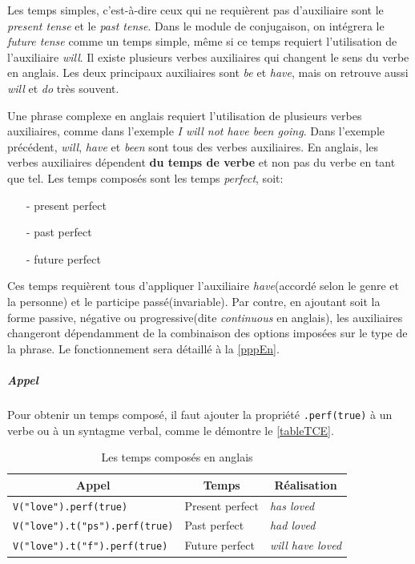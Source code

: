 \documentclass[11pt]{article} %
\newcommand{\real}[1]{\emph{#1}}
\begin{document}
Les temps simples, c'est-à-dire ceux qui ne requièrent pas d'auxiliaire
sont le \emph{present tense} et le \emph{past tense}. Dans le module de
conjugaison, on intégrera le \emph{future tense} comme un temps simple, même si 
ce temps requiert l'utilisation de l'auxiliaire \emph{will}.
Il existe plusieurs verbes auxiliaires qui changent
le sens du verbe en anglais. Les deux principaux auxiliaires sont \emph{be}
et \emph{have}, mais on retrouve aussi \emph{will} et \emph{do} très souvent.

Une phrase complexe en anglais requiert l'utilisation de plusieurs verbes auxiliaires,
comme dans l'exemple \real{I will not have been going}. Dans l'exemple
précédent, \emph{will}, \emph{have} et \emph{been} sont tous des verbes
auxiliaires. En anglais,
les verbes auxiliaires dépendent \textbf{du temps de verbe} et non pas du 
verbe en tant que tel. Les temps composés sont les
temps \emph{perfect}, soit:
\begin{itemize}
\item[-]present perfect
\item[-]past perfect
\item[-]future perfect
\end{itemize} Ces temps requièrent tous d'appliquer l'auxiliaire
\emph{have}(accordé selon le genre et la personne) et le participe passé(invariable). Par contre, en ajoutant soit la forme passive, négative ou progressive(dite \emph{continuous}
en anglais), les auxiliaires changeront dépendamment de la combinaison
des options imposées sur le type de la phrase. Le fonctionnement sera détaillé à la \autoref{pppEn}.

\subparagraph{Appel}

Pour obtenir un temps composé, il faut ajouter la propriété \texttt{.perf(true)} à un verbe ou à un syntagme verbal, comme le démontre le \autoref{tableTCE}.

\begin{table}[ht]
\caption{Les temps composés en anglais}
\centering
\begin{tabular}{|l|l|l|}
\hline
\multicolumn{1}{|c}{Appel} & \multicolumn{1}{|c}{Temps} & \multicolumn{1}{|c|}{Réalisation} \\
\hline
\hline
\texttt{V("love").perf(true)} & Present perfect & \real{has loved} \\
\hline
\texttt{V("love").t("ps").perf(true)} & Past perfect & \real{had loved} \\
\hline
\texttt{V("love").t("f").perf(true)} & Future perfect & \real{will have loved} \\
\hline
\end{tabular}
\label{tableTCE}
\end{table}
\end{document}
